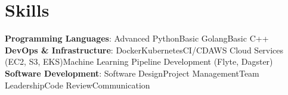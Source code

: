 

\sectionsep



\section{Skills}

\textbf{Programming Languages}: Advanced Python\inlinespace Basic Golang\inlinespace Basic C++ \\[6pt]

\textbf{DevOps \& Infrastructure}: Docker\inlinespace Kubernetes\inlinespace CI/CD\inlinespace AWS Cloud Services (EC2, S3, EKS)\inlinespace Machine Learning Pipeline Development (Flyte, Dagster) \\[6pt]

\textbf{Software Development}: Software Design\inlinespace Project Management\inlinespace Team Leadership\inlinespace Code Review\inlinespace Communication
